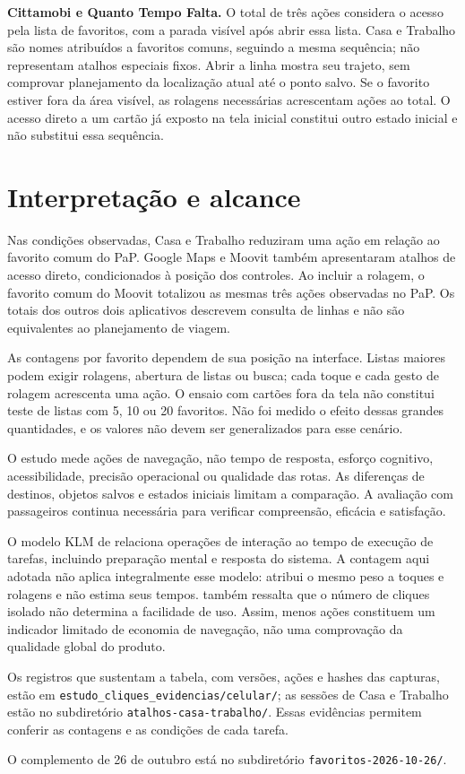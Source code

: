 \textbf{Cittamobi e Quanto Tempo Falta.} O total de três ações considera o acesso pela lista de favoritos, com a parada visível após abrir essa lista. Casa e Trabalho são nomes atribuídos a favoritos comuns, seguindo a mesma sequência; não representam atalhos especiais fixos. Abrir a linha mostra seu trajeto, sem comprovar planejamento da localização atual até o ponto salvo. Se o favorito estiver fora da área visível, as rolagens necessárias acrescentam ações ao total. O acesso direto a um cartão já exposto na tela inicial constitui outro estado inicial e não substitui essa sequência.

\section{Interpretação e alcance}\label{sec:cliques-interpretacao}
Nas condições observadas, Casa e Trabalho reduziram uma ação em relação ao favorito comum do PaP. Google Maps e Moovit também apresentaram atalhos de acesso direto, condicionados à posição dos controles. Ao incluir a rolagem, o favorito comum do Moovit totalizou as mesmas três ações observadas no PaP. Os totais dos outros dois aplicativos descrevem consulta de linhas e não são equivalentes ao planejamento de viagem.

As contagens por favorito dependem de sua posição na interface. Listas maiores podem exigir rolagens, abertura de listas ou busca; cada toque e cada gesto de rolagem acrescenta uma ação. O ensaio com cartões fora da tela não constitui teste de listas com 5, 10 ou 20 favoritos. Não foi medido o efeito dessas grandes quantidades, e os valores não devem ser generalizados para esse cenário.

O estudo mede ações de navegação, não tempo de resposta, esforço cognitivo, acessibilidade, precisão operacional ou qualidade das rotas. As diferenças de destinos, objetos salvos e estados iniciais limitam a comparação. A avaliação com passageiros continua necessária para verificar compreensão, eficácia e satisfação.

O modelo KLM de \citet{card1980} relaciona operações de interação ao tempo de execução de tarefas, incluindo preparação mental e resposta do sistema. A contagem aqui adotada não aplica integralmente esse modelo: atribui o mesmo peso a toques e rolagens e não estima seus tempos. \citet{laubheimer2019} também ressalta que o número de cliques isolado não determina a facilidade de uso. Assim, menos ações constituem um indicador limitado de economia de navegação, não uma comprovação da qualidade global do produto.

Os registros que sustentam a tabela, com versões, ações e hashes das capturas, estão em \mbox{\nolinkurl{estudo_cliques_evidencias/celular/}}; as sessões de Casa e Trabalho estão no subdiretório \mbox{\nolinkurl{atalhos-casa-trabalho/}}. Essas evidências permitem conferir as contagens e as condições de cada tarefa.

O complemento de 26 de outubro está no subdiretório \mbox{\nolinkurl{favoritos-2026-10-26/}}.


